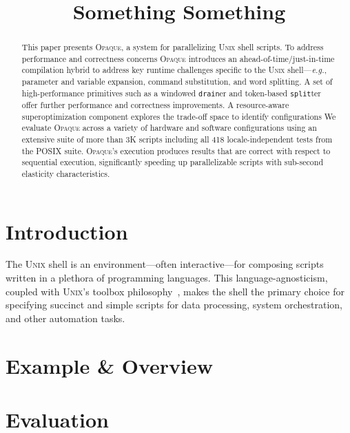 \documentclass[sigplan, screen, review, anonymous]{acmart}
\newcommand{\eg}{{\em e.g.}, }
\newcommand{\ttt}[1]{\texttt{#1}}
\newcommand{\unix}{{\scshape Unix}\xspace}
\newcommand{\sys}{{\scshape Opaque}\xspace}
\begin{document}
\title{Something Something}

\begin{abstract}
This paper presents \sys, a system for parallelizing \unix shell scripts. 
To address performance and correctness concerns 
\sys introduces an ahead-of-time/just-in-time compilation hybrid to address key runtime challenges specific to the \unix shell---\eg parameter and variable expansion, command substitution, and word splitting.
A set of high-performance primitives such as a windowed \ttt{drain}er and token-based \ttt{split}ter offer further  performance and correctness improvements.
A resource-aware superoptimization component explores the trade-off space to identify configurations 
We evaluate \sys across a variety of hardware and software configurations using an extensive suite of more than 3K scripts including all 418 locale-independent tests from the POSIX suite.
\sys's execution produces results that are correct with respect to sequential execution, significantly speeding up parallelizable scripts with sub-second elasticity characteristics. %
\end{abstract}

\maketitle

\section{Introduction}
\label{intro}

The \unix shell is an environment---often interactive---for composing scripts written in a plethora of programming languages.
This language-agnosticism, coupled with \unix's toolbox philosophy~\cite{mcilroy1978unix}, makes the shell the primary choice for specifying succinct and simple scripts for data processing, system orchestration, and other automation tasks.

\section{Example \& Overview}
\label{overview}

\section{Evaluation}
\label{eval}


{\small
  
}
\end{document}

